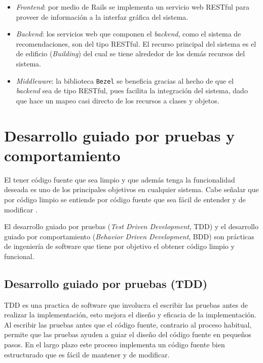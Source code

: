 \begin{itemize}
\item \textit{Frontend}: por medio de Rails se implementa un servicio web RESTful
  para proveer de información a la interfaz gráfica del sistema.
\item \textit{Backend}: los servicios web que componen el \textit{backend}, como el
  sistema de recomendaciones, son del tipo RESTful. El recurso principal del sistema
  es el de edificio (\textit{Building}) del cual se tiene alrededor de los demás
  recursos del sistema.
\item \textit{Middleware}: la biblioteca \texttt{Bezel} se beneficia gracias al hecho
  de que el \textit{backend} sea de tipo RESTful, pues facilita la integración del
  sistema, dado que hace un mapeo casi directo de los recursos a clases y objetos.

\end{itemize}


\section{Desarrollo guiado por pruebas y comportamiento}
El tener código fuente que sea limpio y que además tenga la funcionalidad deseada
es uno de los principales objetivos en cualquier sistema. Cabe señalar que
por código limpio se entiende por código fuente que sea fácil de entender
y de modificar \cite{4_beck_2003}.

El desarrollo guiado por pruebas (\textit{Test Driven Development}, TDD) y el
desarrollo guiado por comportamiento (\textit{Behavior Driven Development}, BDD)
son prácticas de ingeniería de software que tiene por objetivo el obtener código
limpio y funcional.

\subsection{Desarrollo guiado por pruebas (TDD)}
TDD es una practica de software que involucra el escribir las pruebas antes de
realizar la implementación, esto mejora el diseño y eficacia de la implementación.
Al escribir las pruebas antes que el código fuente, contrario al proceso habitual,
permite que las pruebas ayuden a guiar el diseño del código fuente en pequeños
pasos. En el largo plazo este proceso implementa un código fuente bien
estructurado que es fácil de mantener y de modificar\cite{4_beck_2003}.

\vspace{2.5mm}

